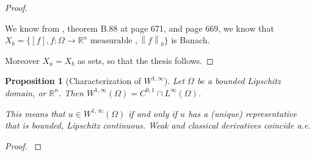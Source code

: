 \documentclass[english,a4paper,9pt,oneside]{scrbook}	%
\theoremstyle{break}
\newtheorem{prop}[equation]{Proposition}
\newenvironment{mproof}[1][\proofname]{%
  \begin{proof}[#1]$ $\par\nobreak\ignorespaces
}{%
  \end{proof}
}
\renewcommand*{\proofname}{Proof}
\theoremstyle{remark}
\newcommand{\mR}{\mathbb{R}}
\newcommand{\norm}[1]{\left\lVert#1\right\rVert}
\newcommand{\cc}{\subset\subset}
\begin{document}
\begin{appendices}
\begin{mproof}
We know from \cite{leoni}, theorem B.88 at page 671, and page 669, we know that $X_b = \{[f], f: \Omega \rightarrow \mR^n \text{ measurable }, \norm{f}_b\}$ is Banach.

Moreover $X_a=X_b$ as sets, so that the thesis follows.


%
%
%
%
%
%

\end{mproof}

\begin{prop}[Characterization of $W^{1,\infty}$]
\label{prop:lip}
Let $\Omega$ be a bounded Lipschitz domain, or $\mathbb{R}^n$. Then $W^{1,\infty}(\Omega) = C^{0,1}\cap L^\infty(\Omega)$.

This means that $u\in W^{1,\infty}(\Omega)$ if and only if $u$ has a (unique) representative that is bounded, Lipschitz continuous. Weak and classical derivatives coincide a.e.
\end{prop}
\begin{mproof}

%
%
%
%


\end{mproof}
\end{appendices}
\end{document}
